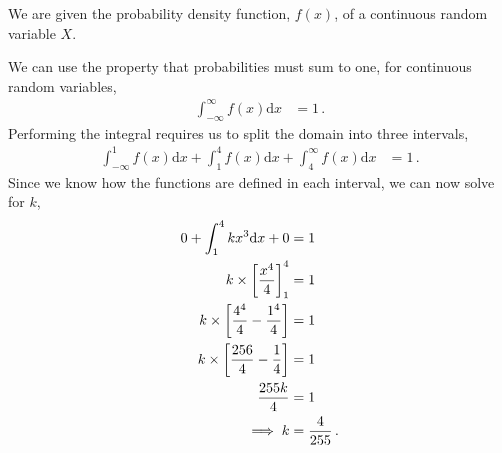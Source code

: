 %
%


\begin{subquestions}

\subquestion
	
We are given the probability density function, $f(x)$, of a continuous random variable $X$.

We can use the property that probabilities must sum to one,  for continuous random variables,
\begin{align}
	\int_{-\infty}^{\infty} f(x)\mathrm{d}x & = 1 \,. 
\end{align}
Performing the integral requires us to split the domain into three intervals,
\begin{align}
	\int_{-\infty}^{1} f(x)\mathrm{d}x + \int_{1}^{4} f(x)\mathrm{d}x + \int_{4}^{\infty} f(x)\mathrm{d}x & = 1 \,. 
\end{align}
Since we know how the functions are defined in each interval, we can now solve for $k$,
\begin{align}
	0 + \int_{1}^{4} kx^3\mathrm{d}x + 0  & = 1 \nonumber \\
	k \times \left[\frac{x^4}{4}\right]^4_1 & = 1 \nonumber \\
	k \times \left[\frac{4^4}{4} - \frac{1^4}{4} \right] & = 1 \nonumber \\
	k \times \left[\frac{256}{4} - \frac{1}{4} \right] & = 1 \nonumber \\
	\frac{255k}{4} & = 1 \nonumber \\
	\implies k & = \frac{4}{255} \,.
\end{align}


\subquestion


\end{subquestions}
